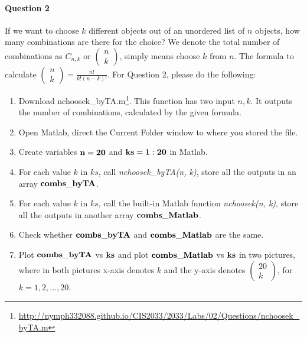 \documentclass[11pt]{article} %
\begin{document}
\paragraph*{Question 2}
If we want to choose $k$ different objects out of an unordered list of $n$ objects, how many combinations are there for the choice? We denote the total number of combinations as $C_{n,k}$ or $\left(\begin{array}{c} n\\k\end{array} \right)$, simply means choose $k$ from $n$. The formula to calculate $\left( \begin{array}{c} n\\k \end{array} \right) = \frac{n!}{k!(n-k)!}$. For Question 2, please do the following:
\begin{enumerate}
\item Download nchoosek\_byTA.m\footnote{\href{http://nymph332088.github.io/CIS2033/2033/Labs/02/Questions/nchoosek\_byTA.m}{http://nymph332088.github.io/CIS2033/2033/Labs/02/Questions/nchoosek\_byTA.m}}. This function has two input $n,k$. It outputs the number of combinations, calculated by  the given formula.
\item Open Matlab, direct the Current Folder window to where you stored the file.
\item Create variables $\bf n = 20$ and $\bf ks = 1:20$ in Matlab.
\item For each value $k$ in $ks$, call {\it nchoosek\_byTA(n, k)}, store all the outputs in an array $\bf combs\_byTA$.
\item For each value $k$ in $ks$, call the built-in Matlab function {\it nchoosek(n, k)}, store all the outputs in another array $\bf combs\_Matlab$. 
\item Check whether $\bf combs\_byTA$ and $\bf combs\_Matlab$ are the same.
\item Plot $\bf combs\_byTA$ vs $\bf ks$ and plot $\bf combs\_Matlab$ vs $\bf ks$ in two pictures, where in both pictures x-axis denotes $k$ and the y-axis denotes $\left( \begin{array}{c} 20\\k \end{array} \right)$, for $k = 1, 2, \ldots, 20$.
\end{enumerate}
\end{document}
